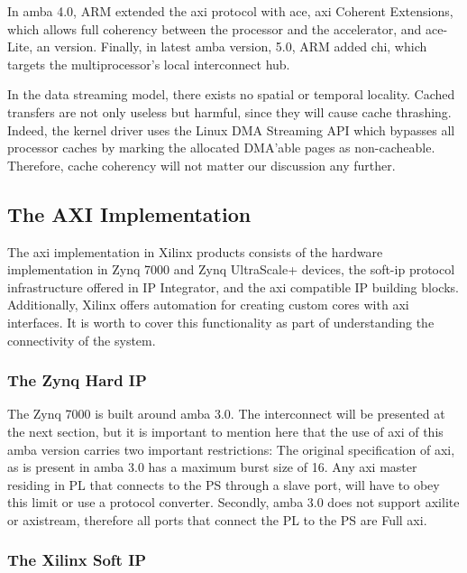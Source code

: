 In \gls{amba} 4.0, ARM extended the \gls{axi} protocol with \gls{ace},
\gls{axi} Coherent Extensions, which allows full coherency between
the processor and the accelerator, and \gls{ace}-Lite, 
an  version. 
Finally, in latest \gls{amba} version, 5.0, ARM added \gls{chi}, 
which targets the multiprocessor's local interconnect hub.

In the data streaming model, there exists no spatial or temporal locality. 
Cached transfers are not only useless but harmful, since they will cause cache thrashing. 
Indeed, the kernel driver uses the Linux DMA Streaming API
which bypasses all processor caches by marking 
the allocated DMA'able pages as non-cacheable.
Therefore, cache coherency will not matter our discussion any further.

\subsection{The AXI Implementation}

The \gls{axi} implementation in Xilinx products consists of the hardware 
implementation in Zynq 7000 and Zynq UltraScale+ devices,
the \gls{soft-ip} protocol infrastructure offered in IP Integrator, 
and the \gls{axi} compatible IP building blocks. 
Additionally, Xilinx offers automation for creating 
custom cores with \gls{axi} interfaces.
It is worth to cover this functionality as 
part of understanding the connectivity of the system.

\subsubsection{The Zynq Hard IP}

The Zynq 7000 is built around \gls{amba} 3.0. 
The interconnect will be presented at the next section,
but it is important to mention here that 
the use of \gls{axi} of this \gls{amba} version
carries two important restrictions: 
The original specification of \gls{axi},
as is present in \gls{amba} 3.0 has a maximum \gls{burst} size of 16. 
Any \gls{axi} master residing in PL that connects to the PS through a slave port,
will have to obey this limit or use a protocol converter.
Secondly, \gls{amba} 3.0 does not support \gls{axilite} or \gls{axistream}, 
therefore all ports that connect the PL to the PS are Full \gls{axi}.

\subsubsection{The Xilinx Soft IP}
\label{sect:xilinx-ip}

